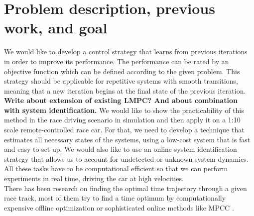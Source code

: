 \section{Problem description, previous work, and goal}
We would like to develop a control strategy that learns from previous iterations in order to improve its performance. The performance can be rated by an objective function which can be defined according to the given problem. This strategy should be applicable for repetitive systems with smooth transitions, meaning that a new iteration begins at the final state of the previous iteration.
{\bfseries{Write about extension of existing LMPC? And about combination with system identification.}}
We would like to show the practicability of this method in the race driving scenario in simulation and then apply it on a 1:10 scale remote-controlled race car. For that, we need to develop a technique that estimates all necessary states of the systems, using a low-cost system that is fast and easy to set up. We would also like to use an online system identification strategy that allows us to account for undetected or unknown system dynamics. All these tasks have to be computational efficient so that we can perform experiments in real time, driving the car at high velocities.\\
There has been research on finding the optimal time trajectory through a given race track, most of them try to find a time optimum by computationally expensive offline optimization or sophisticated online methods like MPCC \cite{Liniger2015}.

